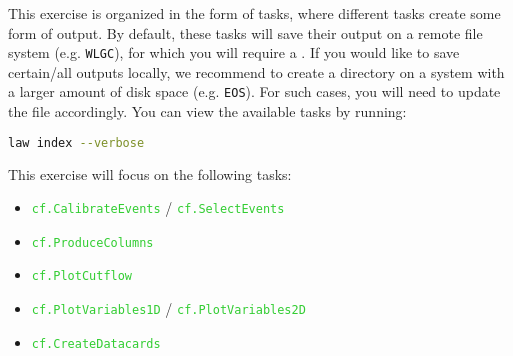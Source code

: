 This exercise is organized in the form of  tasks, where different tasks create some form of output. By default, these tasks will save their output on a remote file system (e.g. \texttt{WLGC}), for which you will require a . If you would like to save certain/all outputs locally, we recommend to create a directory on a system with a larger amount of disk space (e.g. \texttt{EOS}). For such cases, you will need to update the  file accordingly. You can view the available tasks by running:
\begin{lstlisting}[language=bash]
law index --verbose
\end{lstlisting}

This exercise will focus on the following tasks:

\begin{itemize}
    \item \texttt{\textcolor{LimeGreen}{cf.CalibrateEvents}} / \texttt{\textcolor{LimeGreen}{cf.SelectEvents}}
    \item \texttt{\textcolor{LimeGreen}{cf.ProduceColumns}}
    \item \texttt{\textcolor{LimeGreen}{cf.PlotCutflow}}
    \item \texttt{\textcolor{LimeGreen}{cf.PlotVariables1D}} / \texttt{\textcolor{LimeGreen}{cf.PlotVariables2D}}
    \item \texttt{\textcolor{LimeGreen}{cf.CreateDatacards}}
\end{itemize}



